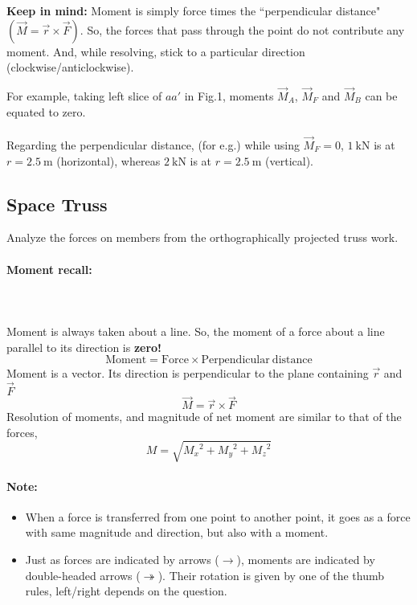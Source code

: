 \documentclass{article}
\newcommand{\para}[1]{\paragraph{#1}\mbox{}\\}
\begin{document}
{\begin{enumerate}[(a)]
\textbf{\Large Keep in mind:} Moment is simply force times the ``perpendicular distance" $(\vec M=\vec r\times \vec F)$. So, the forces that pass through the point do not contribute any moment. And, while resolving, stick to a particular direction (clockwise/anticlockwise).
\newline

For example, taking left slice of $aa'$ in Fig.1, moments $\vec M_A$, $\vec M_F$ and $\vec M_B$ can be equated to zero.
\\
\\
Regarding the perpendicular distance, (for e.g.) while using $\vec M_F=0$, $\mathrm{1\ kN}$ is at $r=\mathrm{2.5\ m}$ (horizontal), whereas $\mathrm{2\ kN}$ is at $r=\mathrm{2.5\ m}$ (vertical).
\end{enumerate}
\newpage
\subsection{\LARGE Space Truss}
Analyze the forces on members from the orthographically projected truss work.
\para{\Large Moment recall:}
\\
Moment is always taken about a line. So, the moment of a force about a line parallel to its direction is \textbf{zero!}
$$\mathrm{Moment=Force\times Perpendicular\ distance}$$
Moment is a vector. Its direction is perpendicular to the plane containing $\vec r$ and $\vec F$
{\LARGE $$\vec M=\vec r \times \vec F$$}
Resolution of moments, and magnitude of net moment are similar to that of the forces,
{\LARGE $$M=\sqrt{{M_x}^2+{M_y}^2+{M_z}^2}$$}
\paragraph{\Large Note:}
\begin{itemize}
\item When a force is transferred from one point to another point, it goes as a force with same magnitude and direction, but also with a moment.
\item Just as forces are indicated by arrows ($\rightarrow $), moments are indicated by double-headed arrows ({\huge $\twoheadrightarrow $}). Their rotation is given by one of the thumb rules, left/right depends on the question.
\end{itemize}
\newpage
}
\end{document}
